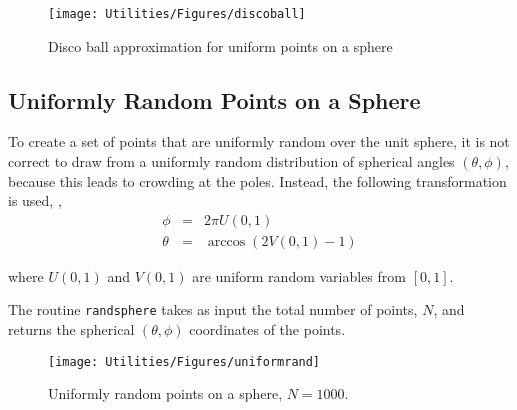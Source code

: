 \begin{figure}[H]
\centering
\texttt{[image: Utilities/Figures/discoball]}
\caption{Disco ball approximation for uniform points on a sphere}
\end{figure}

{\footnotesize
{}
}

\clearpage
\newpage

\subsection{Uniformly Random Points on a Sphere}

To create a set of points that are uniformly random over the unit sphere, it is not correct to draw from a uniformly random distribution of spherical angles $(\theta,\phi)$, because this leads to crowding at the poles.  Instead, the following transformation is used, \cite{randsphere}, 
\begin{eqnarray}
\phi &=& 2\pi U(0,1) \\
\theta &=& \arccos(2V(0,1)-1)
\end{eqnarray}

\noindent where $U(0,1)$ and $V(0,1)$ are uniform random variables from $[0,1]$.  

The routine \texttt{randsphere} takes as input the total number of points, $N$, and returns the spherical $(\theta,\phi)$ coordinates of the points.  

\begin{figure}[H]
\centering
\texttt{[image: Utilities/Figures/uniformrand]}
\caption{Uniformly random points on a sphere, $N = 1000$. }
\end{figure}

{\footnotesize
{}
}

%
%
%
%
%
%
%
%
%

%

